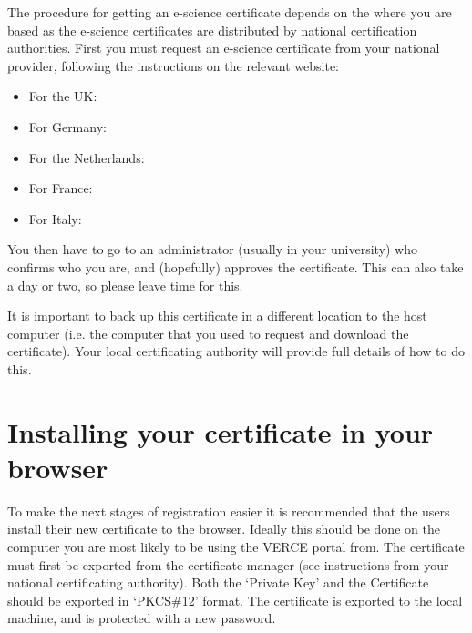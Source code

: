 \documentclass[english]{book}
\begin{document}
The procedure for getting an e-science certificate depends on the where
you are based as the e-science certificates are distributed by national
certification authorities. First you must request an e-science
certificate from your national provider, following the instructions on
the relevant website:
\begin{itemize}
\item {} 
For the UK: 

\item {} 
For Germany:

\item {} 
For the Netherlands: 

\item {} 
For France: 

\item {} 
For Italy: 

\end{itemize}

You then have to go to an administrator (usually in your university) who
confirms who you are, and (hopefully) approves the certificate. This can
also take a day or two, so please leave time for this.

It is important to back up this certificate in a different location to
the host computer (i.e. the computer that you used to request and
download the certificate). Your local certificating authority will
provide full details of how to do this.


\section{Installing your certificate in your browser}
\label{\detokenize{Section3:installing-your-certificate-in-your-browser}}
To make the next stages of registration easier it is recommended that
the users install their new certificate to the browser. Ideally this
should be done on the computer you are most likely to be using the VERCE
portal from. The certificate must first be exported from the certificate
manager (see instructions from your national certificating authority).
Both the ‘Private Key’ and the Certificate should be exported in
‘PKCS\#12’ format. The certificate is exported to the local machine, and
is protected with a new password.
\end{document}
